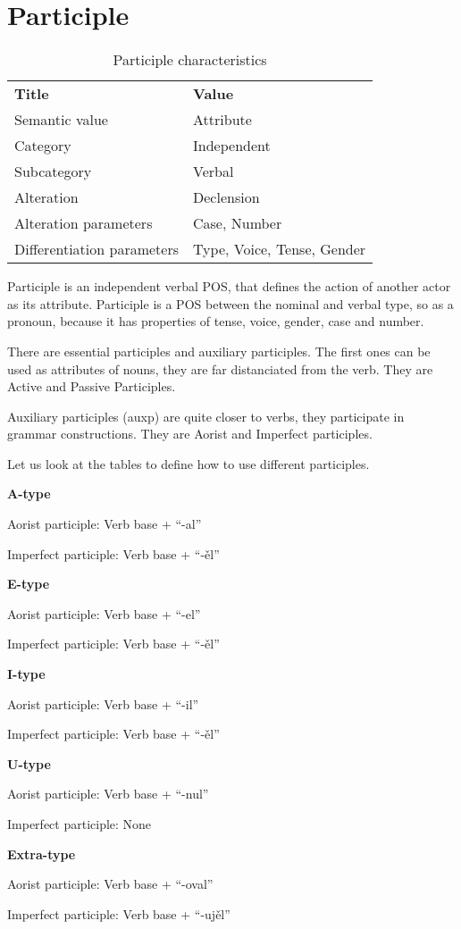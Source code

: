 \section{Participle}


\begin{table}[h]
	\caption{Participle characteristics}
	\begin{tabular}{ll}
		\textbf{Title}              & \textbf{Value}               \\
		Semantic value              & Attribute                    \\
		Category                    & Independent                  \\
		Subcategory                 & Verbal                       \\
		Alteration                  & Declension                   \\
		Alteration parameters       & Case, Number                 \\
		Differentiation parameters  & Type, Voice, Tense, Gender
	\end{tabular}
\end{table}

Participle is an independent verbal POS, that defines the action of another actor as its attribute. Participle is a POS between the nominal and verbal type, so as a pronoun, because it has properties of tense, voice, gender, case and number.

There are essential participles and auxiliary participles. The first ones can be used as attributes of nouns, they are far distanciated from the verb. They are Active and Passive Participles.

Auxiliary participles (\gls{auxp}) are quite closer to verbs, they participate in grammar constructions. They are Aorist and Imperfect participles.

Let us look at the tables to define how to use different participles.

\textbf{A-type}

Aorist participle: Verb base + “-al”

Imperfect participle: Verb base + “-ěl”

\textbf{E-type}

Aorist participle: Verb base + “-el”

Imperfect participle: Verb base + “-ěl”

\textbf{I-type}


Aorist participle: Verb base + “-il”

Imperfect participle: Verb base + “-ěl”

\textbf{U-type}

Aorist participle: Verb base + “-nul”

Imperfect participle: None

\textbf{Extra-type }

Aorist participle: Verb base + “-oval”

Imperfect participle: Verb base + “-ujěl”

